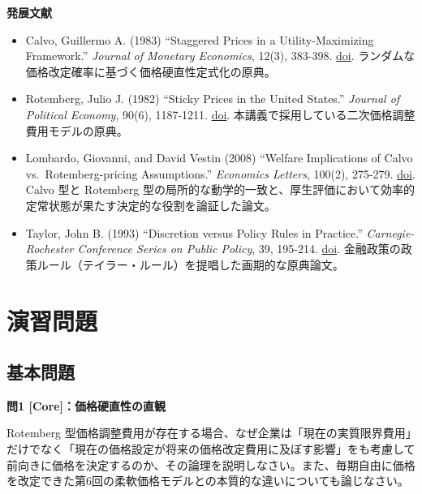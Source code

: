 \documentclass[
  japanese,
  lualatex,
  ja=standard,
  12pt,
  a4paper]{ltjsarticle}
\providecommand{\tightlist}{%
  \setlength{\itemsep}{0pt}\setlength{\parskip}{0pt}}
\begin{document}
\Needspace{0.30\textheight}

\textbf{発展文献}

\begin{itemize}
\tightlist
\item
  Calvo, Guillermo A. (1983) ``Staggered Prices in a Utility-Maximizing
  Framework.'' \emph{Journal of Monetary Economics}, 12(3), 383-398.
  \href{https://doi.org/10.1016/0304-3932(83)90060-0}{doi}.
  ランダムな価格改定確率に基づく価格硬直性定式化の原典。
\item
  Rotemberg, Julio J. (1982) ``Sticky Prices in the United States.''
  \emph{Journal of Political Economy}, 90(6), 1187-1211.
  \href{https://doi.org/10.1086/261117}{doi}.
  本講義で採用している二次価格調整費用モデルの原典。
\item
  Lombardo, Giovanni, and David Vestin (2008) ``Welfare Implications of
  Calvo vs.~Rotemberg-pricing Assumptions.'' \emph{Economics Letters},
  100(2), 275-279.
  \href{https://doi.org/10.1016/j.econlet.2008.02.008}{doi}. Calvo 型と
  Rotemberg
  型の局所的な動学的一致と、厚生評価において効率的定常状態が果たす決定的な役割を論証した論文。
\item
  Taylor, John B. (1993) ``Discretion versus Policy Rules in Practice.''
  \emph{Carnegie-Rochester Conference Series on Public Policy}, 39,
  195-214. \href{https://doi.org/10.1016/0167-2231(93)90009-L}{doi}.
  金融政策の政策ルール（テイラー・ルール）を提唱した画期的な原典論文。
\end{itemize}

\Needspace{0.24\textheight}

\section{演習問題}\label{ux6f14ux7fd2ux554fux984c}

\subsection{基本問題}\label{ux57faux672cux554fux984c}

\textbf{問1 {[}Core{]}：価格硬直性の直観}

Rotemberg
型価格調整費用が存在する場合、なぜ企業は「現在の実質限界費用」だけでなく「現在の価格設定が将来の価格改定費用に及ぼす影響」をも考慮して前向きに価格を決定するのか、その論理を説明しなさい。また、毎期自由に価格を改定できた第6回の柔軟価格モデルとの本質的な違いについても論じなさい。

\Needspace{0.18\textheight}
\end{document}
